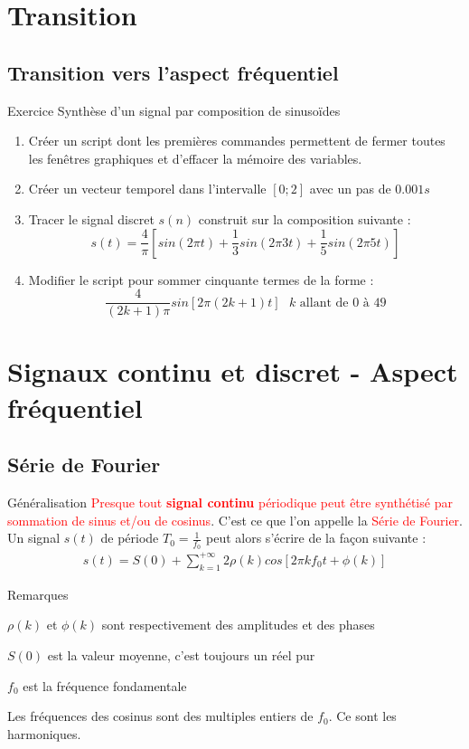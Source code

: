 \documentclass{beamer}
\newcounter{exampleBlockCounter}
\begin{document}
\section{Transition}
\subsection{Transition vers l'aspect fréquentiel} 
\begin{frame} 
	\begin{exampleblock}{Exercice }
	\centering Synthèse d'un signal par composition de sinusoïdes
		\begin{enumerate}
		 	\item Créer un script dont les premières commandes permettent de fermer toutes les fenêtres graphiques et d'effacer la mémoire des variables.
			\item Créer un vecteur temporel dans l'intervalle $[0;2]$ avec un pas de
			  $0.001s$ 
			\item Tracer le signal discret $s(n)$ construit sur la composition suivante :
			\[ 
			s(t) = \frac{4}{\pi}[sin(2\pi t) + \frac{1}{3}sin(2\pi 3 t) +
			\frac{1}{5}sin(2\pi 5 t)]
			\] 
			\item Modifier le script pour sommer cinquante termes de la forme :
			\[
			\frac{4}{(2k+1)\pi}sin[2\pi (2k+1)t]\text{ $k$ allant de $0$ à  $49$}
			\] 
		\end{enumerate}
	\end{exampleblock}
\end{frame}
\section{Signaux continu et discret - Aspect fréquentiel}
\subsection{Série de Fourier} 
\begin{frame}
\begin{block}{Généralisation}
\justifying 
\textcolor{red}{Presque tout \textbf{signal continu} périodique peut être
synthétisé par sommation de sinus et/ou de cosinus}. C'est ce que l'on appelle la \textcolor{red}{Série de Fourier}. Un signal $s(t)$ de
période $T_0 = \frac{1}{f_0}$ peut alors s'écrire de la façon suivante :
\begin{align*}
s(t) = S(0) + \sum_{k=1}^{+\infty} 2\rho (k) cos[2\pi kf_0t+\phi (k)]
\end{align*}
\end{block}
\pause
\begin{alertblock}{Remarques}
	\itemize
	\item $\rho(k)$ et $\phi(k)$ sont respectivement des amplitudes et des phases
	\pause
	\item $S(0)$ est la valeur moyenne, c'est toujours un réel pur
	\pause
	\item $f_0$ est la fréquence fondamentale 
	\pause
	\item Les fréquences des cosinus sont des multiples entiers de $f_0$. Ce sont
	les harmoniques.
\end{alertblock}
\end{frame}
\end{document}
